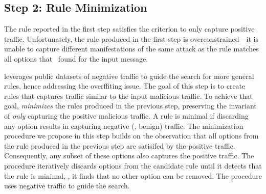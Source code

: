 \documentclass[sigconf,anonymous]{acmart}
\begin{document}




\subsection{Step 2: Rule Minimization}
\label{sec:minimization}

The rule reported in the first step satisfies the criterion to only
capture positive traffic. Unfortunately, the rule produced in the
first step is overconstrained---it is unable to capture different
manifestations of the same attack as the rule matches all options that
\tname\ found for the input message.


\tname{} leverages public datasets\cite{tcpreplay} of negative traffic
to guide the search for more general rules, hence addressing the
overffiting issue. The goal of this step is to create rules that
captures traffic similar to the input malicious traffic. To achieve
that goal, \tname{} \emph{minimizes} the rules produced in the
previous step, preserving the invariant of \emph{only} capturing the
positive malicious traffic. A rule is minimal if discarding any option
results in capturing negative (\ie{}, benign) traffic.  The
minimization procedure we propose in this step builds on the
observation that all options from the rule produced in the previous
step are satisifed by the positive traffic. Consequently, any subset
of these options also captures the positive traffic. The procedure
iteratively discards options from the candidate rule until it detects
that the rule is minimal, \ie{}, it finds that no other option can be
removed. The procedure uses negative traffic to guide the search.
\end{document}
